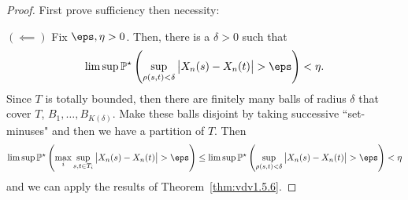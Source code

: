 \begin{proof} First prove sufficiency then necessity:

	\((\impliedby)\) Fix \(\eps,\eta > 0\). Then, there is a  \(\delta > 0\) such that  \[\lim\sup\P^\star\left(\sup_{\rho(s,t)<\delta}\left|X_n(s)-X_n(t)\right|>\eps\right)<\eta.\] 
	Since \(T\) is totally bounded, then there are finitely many balls of radius  \(\delta\) that cover  \(T\),  \(B_1, \dots, B_{K(\delta)}\). Make these balls disjoint by taking successive ``set-minuses" and then we have a partition of \(T\). Then
	\begin{align*}
		\lim\sup\P^\star\left(\max_i\sup_{s,t\in T_i}\left|X_n(s)-X_n(t)\right|>\eps\right) \leq \lim\sup\P^\star\left(\sup_{\rho(s,t) <\delta} \left|X_n(s)-X_n(t)\right|>\eps\right) <\eta
	\end{align*}
	and we can apply the results of Theorem~\ref{thm:vdv1.5.6}.


\end{proof}
